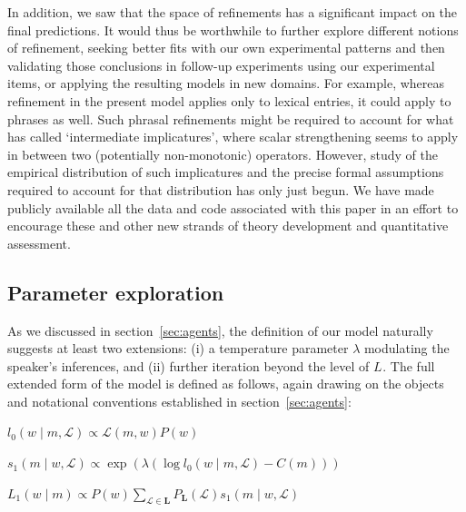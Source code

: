 \documentclass[leqno,12pt]{article}
\newcommand{\secref}[1]{section~\ref{#1}}
\newcommand{\given}{\mid}
\newcommand{\state}{w}
\newcommand{\Lex}{\mathcal{L}}
\newcommand{\LexSet}{\mathbf{L}}
\newcommand{\msg}{m}
\newcommand{\Costs}{C}
\newcommand{\StatePrior}{P}
\newcommand{\LexPrior}{P_{\LexSet}}
\newcommand{\listenerZero}{l_{0}}
\newcommand{\speakerOne}{s_{1}}
\newcommand{\UncertaintyListener}[1][]{L_{#1}}
\begin{document}
{In addition, we saw that the space of refinements has a significant
impact on the final predictions. It would thus be worthwhile to
further explore different notions of refinement, seeking better fits
with our own experimental patterns and then validating those
conclusions in follow-up experiments using our experimental items, or
applying the resulting models in new domains.  For example, whereas
refinement in the present model applies only to lexical entries, it
could apply to phrases as well.  Such phrasal refinements might be
required to account for what \citet{Sauerland:2012,Sauerland:2014} has
called `intermediate implicatures', where scalar strengthening seems
to apply in between two (potentially non-monotonic) operators.
However, study of the empirical distribution of such implicatures and
the precise formal assumptions required to account for that
distribution has only just begun.  We have made publicly available all
the data and code associated with this paper in an effort to encourage
these and other new strands of theory development and quantitative
assessment.




\begin{appendix}

\section{Parameter exploration}\label{app:paramexplore}

As we discussed in \secref{sec:agents}, the definition of our model
naturally suggests at least two extensions: (i) a temperature
parameter $\lambda$ modulating the speaker's inferences, and (ii)
further iteration beyond the level of $\UncertaintyListener$. The full
extended form of the model is defined as follows, again drawing on the
objects and notational conventions established in \secref{sec:agents}:
%
\begin{examples}
\item\label{agents-extended}
  \begin{examples}
  \item
    $\listenerZero(\state \given \msg, \Lex) \propto \Lex(\msg, \state)\StatePrior(\state)$

  \item 
    $\speakerOne(\msg \given \state, \Lex) \propto
    \exp
    \left(\lambda \left(
      \log\listenerZero(\state \given \msg, \Lex)
      - 
      \Costs(\msg)\right)
    \right)$
    
  \item
    $\UncertaintyListener[1](\state \given \msg) 
    \propto 
    \StatePrior(\state)
    \sum_{\Lex \in \LexSet}
    \LexPrior(\Lex)
    \speakerOne(\msg \given \state, \Lex)$


\end{examples}
\end{examples}
\end{appendix}}
\end{document}
